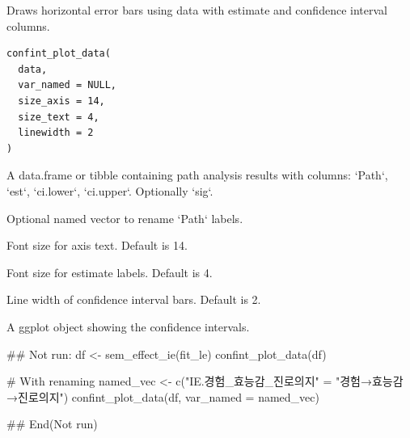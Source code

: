 \documentclass[a4paper]{book}
\begin{document}
%
\begin{Description}
Draws horizontal error bars using data with estimate and confidence interval columns.
\end{Description}
%
\begin{Usage}
\begin{verbatim}
confint_plot_data(
  data,
  var_named = NULL,
  size_axis = 14,
  size_text = 4,
  linewidth = 2
)
\end{verbatim}
\end{Usage}
%
\begin{Arguments}
\begin{ldescription}
\item[\code{data}] A data.frame or tibble containing path analysis results with columns: `Path`, `est`, `ci.lower`, `ci.upper`. Optionally `sig`.

\item[\code{var\_named}] Optional named vector to rename `Path` labels.

\item[\code{size\_axis}] Font size for axis text. Default is 14.

\item[\code{size\_text}] Font size for estimate labels. Default is 4.

\item[\code{linewidth}] Line width of confidence interval bars. Default is 2.
\end{ldescription}
\end{Arguments}
%
\begin{Value}
A ggplot object showing the confidence intervals.
\end{Value}
%
\begin{Examples}
\begin{ExampleCode}
\#\# Not run: 
df <- sem_effect_ie(fit_le)
confint_plot_data(df)

# With renaming
named_vec <- c("IE.경험_효능감_진로의지" = "경험→효능감→진로의지")
confint_plot_data(df, var_named = named_vec)

## End(Not run)
\end{ExampleCode}
\end{Examples}
\end{document}
